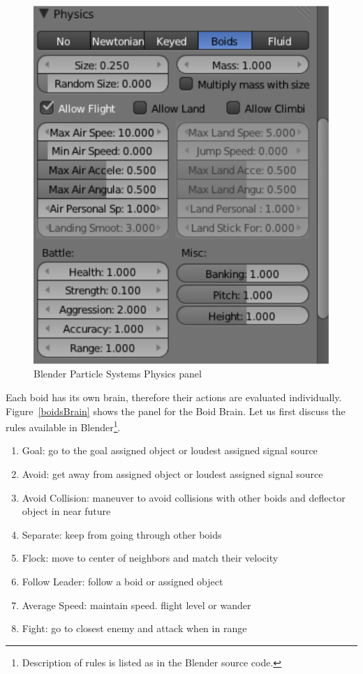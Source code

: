 \begin{figure}[htbp]
\begin{center}
\includegraphics[scale = 0.5]{figures/boidsPhysics.pdf} 
\caption{Blender Particle Systems Physics panel}
\label{boidsPhysics}
\end{center}
\end{figure}

Each boid has its own brain, therefore their actions are evaluated individually. Figure~\ref{boidsBrain} shows the panel for the Boid Brain. Let us first discuss the rules available in Blender\footnote{Description of rules is listed as in the Blender source code.}.

\begin{enumerate}
\item{Goal: go to the goal assigned object or loudest assigned signal source}
\item{Avoid: get away from assigned object or loudest assigned signal source}
\item{Avoid Collision: maneuver to avoid collisions with other boids and deflector object in near future}
\item{Separate: keep from going through other boids}
\item{Flock: move to center of neighbors and match their velocity}
\item{Follow Leader: follow a boid or assigned object}
\item{Average Speed: maintain speed. flight level or wander}
\item{Fight: go to closest enemy and attack when in range}
\end{enumerate}

